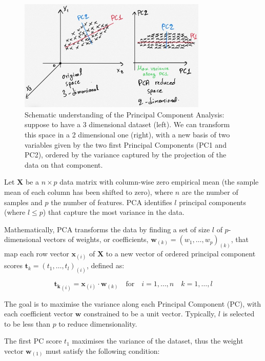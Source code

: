 \begin{figure}
    \centering
    \includegraphics[width=0.8\textwidth]{figures/pca.jpg}
    \caption{Schematic understanding of the Principal Component Analysis: suppose to have a 3 dimensional dataset (left). We can transform this space in a 2 dimensional one (right), with a new basis of two variables given by the two first Principal Components (PC1 and PC2), ordered by the variance captured by the projection of the data on that component.}
    \label{fig:pca}
\end{figure}


Let $\mathbf{X}$ be a $n \times p$ data matrix with column-wise zero empirical mean (the sample mean of each column has been shifted to zero), where $n$ are the number of samples and $p$ the number of features. PCA identifies $l$ principal components (where $l \leq p$) that capture the most variance in the data.

Mathematically, PCA transforms the data by finding a set of size $l$ of $p$-dimensional vectors of weights, or coefficients, $\mathbf{w}_{(k)} = (w_1, \ldots, w_p)_{(k)}$, that map each row vector $\mathbf{x}_{(i)}$ of $\mathbf{X}$ to a new vector of ordered principal component scores $\mathbf{t}_{k} = (t_1, \ldots, t_l)_{(i)}$, defined as:

\begin{equation}
\mathbf{t_{k}}_{(i)} = \mathbf{x}_{(i)} \cdot \mathbf{w}_{(k)} \quad \text{for} \quad i = 1, \ldots, n \quad k = 1, \ldots, l
\end{equation}

The goal is to maximise the variance along each Principal Component (PC), with each coefficient vector $\mathbf{w}$ constrained to be a unit vector. Typically, $l$ is selected to be less than $p$ to reduce dimensionality.


The first PC score $t_{1}$ maximises the variance of the dataset, thus the weight vector $\mathbf{w}_{(1)}$ must satisfy the following condition:

